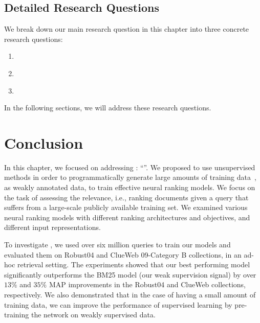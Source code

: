 \subsection{Detailed Research Questions}
We break down our main research question in this chapter into three concrete research questions:
\begin{resqbox}
\begin{enumerate}
\item[\textbf{\resqname{c4.1}}] \emph{}
\item[\textbf{\resqname{c4.2}}] \emph{}
\item[\textbf{\resqname{c4.3}}] \emph{}
\end{enumerate}
\end{resqbox}
In the following sections, we will address these research questions.





\section{Conclusion}
In this chapter, we focused on addressing \textbf{}: ``\emph{}''. 
We proposed to use unsupervised methods in order to programmatically generate large amounts of training data~\citep{Ratner:2016}, as weakly annotated data, to train effective neural ranking models. We focus on the task of assessing the relevance, i.e., ranking documents given a query that suffers from a large-scale publicly available training set. We examined various neural ranking models with different ranking architectures and objectives, and different input representations. 

To investigate \textbf{}, we used over six million queries to train our models and evaluated them on Robust04 and ClueWeb 09-Category B collections, in an ad-hoc retrieval setting.  The experiments showed that our best performing model significantly outperforms the BM25 model (our weak supervision signal) by over $13\%$ and $35\%$ MAP improvements in the Robust04 and ClueWeb collections, respectively. 
We also demonstrated that in the case of having a small amount of training data, we can improve the performance of supervised learning by pre-training the network on weakly supervised data.

